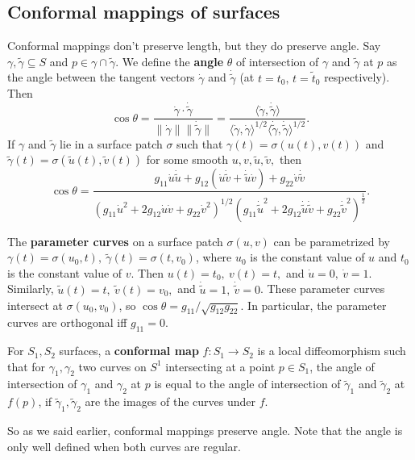 \subsection{Conformal mappings of surfaces}
Conformal mappings don't preserve length, but they do preserve angle. Say $\gamma ,\widetilde \gamma  \subseteq S$ and $p \in \gamma \cap \widetilde \gamma $. We define the \textbf{angle} $\theta$ of intersection of $\gamma $ and $\widetilde \gamma $ at $p$ as the angle between the tangent vectors $\dot \gamma $ and $\dot{\widetilde \gamma } $ (at $t=t_0,\, t=\widetilde t_0$ respectively). Then \[
\cos \theta= \frac{\dot \gamma \cdot \dot{\widetilde \gamma } }{\|\dot \gamma \|\|\dot {\widetilde \gamma } \|}= \frac{\langle \dot \gamma ,\dot{\widetilde \gamma }  \rangle }{\langle \dot \gamma ,\dot \gamma  \rangle ^{1 /2}\langle \dot{\widetilde \gamma } ,\dot{\widetilde \gamma }  \rangle ^{1 /2}}.
\] If $\gamma $ and $\widetilde \gamma $ lie in a surface patch $\sigma$ such that $\gamma (t)=\sigma(u(t),v(t))$ and $\widetilde \gamma (t)=\sigma(\widetilde u(t),\widetilde v(t))$ for some smooth $u,v,\widetilde u,\widetilde v,$ then \[
\cos\theta= \frac{g_{11}\dot u \dot {\widetilde u} +g_{12}(\dot u \dot{\widetilde v} +\dot{\widetilde u} \dot v)+g_{22}\dot v\dot {\widetilde v}}{(g_{11}\dot u^2+2g_{12}\dot u \dot v+g_{22}\dot v^2)^{1 /2}( g_{11}\dot{\widetilde u} ^2+2g_{12}\dot{\widetilde u} \dot{\widetilde v} +g_{22}\dot{\widetilde v} ^2 ) ^{\frac{1}{2}}}.
\] 
\begin{example}
    The \textbf{parameter curves} on a surface patch $\sigma(u,v)$ can be parametrized by $\gamma (t)=\sigma(u_0,t),\ \widetilde \gamma (t)=\sigma(t,v_0)$, where $u_0$ is the constant value of $u$ and $t_0$ is the constant value of $v$. Then $u(t)=t_0,\ v(t)=t,$ and $\dot u=0, \ \dot v=1$. Similarly, $\widetilde u(t)=t, \ \widetilde v(t)=v_0,$ and $\dot{\widetilde u} =1, \ \dot{\widetilde v} =0$. These parameter curves intersect at $\sigma(u_0,v_0)$, so $\cos \theta= g_{11} / \sqrt{g_{12}g_{22}} $. In particular, the parameter curves are orthogonal iff $g_{11}=0$.
\end{example}

\begin{definition}[]
    For $S_1,S_2$ surfaces, a \textbf{conformal map} $f \colon S_1 \to S_2$ is a local diffeomorphism such that for $\gamma_1,\gamma_2  $ two curves on $S^1 $ intersecting at a point $p \in S_1$, the angle of intersection of $\gamma_1 $ and $\gamma_2 $ at $p$ is equal to the angle of intersection of $\widetilde \gamma_1 $ and $\widetilde \gamma_2 $ at $f(p)$, if  $\widetilde \gamma_1,\widetilde \gamma_2  $ are the images of the curves under $f.$
\end{definition}
So as we said earlier, conformal mappings preserve angle. Note that the angle is only well defined when both curves are regular.

